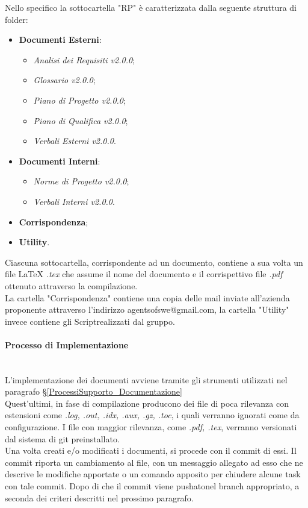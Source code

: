 	Nello specifico la sottocartella "RP" è caratterizzata dalla seguente struttura di folder:
	\begin{itemize}
	\item \textbf{Documenti Esterni}:
		\begin{itemize}
		\item \textit{Analisi dei Requisiti v2.0.0};
		\item \textit{Glossario v2.0.0};
		\item \textit{Piano di Progetto v2.0.0};
		\item \textit{Piano di Qualifica v2.0.0};
		\item \textit{Verbali Esterni v2.0.0}.
		\end{itemize}
	\item \textbf{Documenti Interni}:
		\begin{itemize}
		\item \textit{Norme di Progetto v2.0.0};
		\item \textit{Verbali Interni v2.0.0}.
		\end{itemize}
	\item \textbf{Corrispondenza};
	\item \textbf{Utility}.
	\end{itemize}
	Ciascuna sottocartella, corrispondente ad un documento, contiene a sua volta un file LaTeX \textit{.tex} che assume il nome del documento e il corrispettivo file \textit{.pdf} ottenuto attraverso la compilazione.\\
	La cartella "Corrispondenza" contiene una copia delle mail inviate all'azienda proponente attraverso l'indirizzo agentsofswe@gmail.com, la cartella "Utility" invece contiene gli Script\glossario realizzati dal gruppo.


\paragraph{Processo di Implementazione} \-\\
L'implementazione dei documenti avviene tramite gli strumenti utilizzati nel paragrafo §\ref{ProcessiSupporto_Documentazione}\\
Quest'ultimi, in fase di compilazione producono dei file di poca rilevanza con estensioni come \textit{.log, .out, .idx, .aux, .gz, .toc}, i quali verranno ignorati come da configurazione. I file con maggior rilevanza, come \textit{.pdf, .tex}, verranno versionati dal sistema di git preinstallato. \\
Una volta creati e/o modificati i documenti, si procede con il commit di essi. Il commit riporta un cambiamento al file, con un messaggio allegato ad esso che ne 
descrive le modifiche apportate o un comando apposito per chiudere alcune task con tale commit. Dopo di che il commit viene pushato\glossario nel branch appropriato, a seconda dei criteri descritti nel prossimo paragrafo. 

